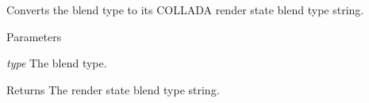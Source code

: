 \label{namespaceFUDaePassStateBlendType_a546d293f6f3c3e7334cfce374d338d32}
Converts the blend type to its COLLADA render state blend type string. 
\begin{DoxyParams}{Parameters}
\item[{\em type}]The blend type. \end{DoxyParams}
\begin{DoxyReturn}{Returns}
The render state blend type string. 
\end{DoxyReturn}
